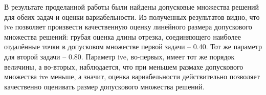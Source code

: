 В результате проделанной работы были найдены допусковые множества решений для обеих задач и оценки вариабельности. Из полученных результатов видно, что ive позволяет произвести качественную оценку линейного размера допускового множества решений: грубая оценка длины отрезка, соединяющего наиболее отдалённые точки в допусковом множестве первой задачи -- 0.40. 
Тот же параметр для второй задачи -- 0.80. Параметр ive, во-первых, имеет тот же порядок величины, а во-вторых, наблюдается, что при меньшем размахе допускового множества ive меньше, а значит, оценка вариабельности действительно позволяет качественно оценивать размер допускового множества решений.